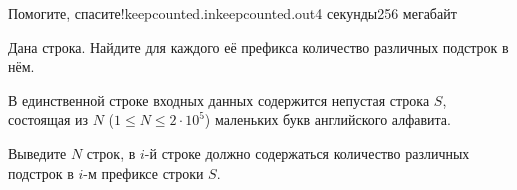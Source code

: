 \begin{problem}{Помогите, спасите!}{keepcounted.in}{keepcounted.out}{4 секунды}{256 мегабайт}

Дана строка. Найдите для каждого её префикса количество различных подстрок в нём.

\InputFile
В единственной строке входных данных содержится непустая строка $S$, состоящая из $N$ ($1 \leq N \leq 2 \cdot 10^5$) маленьких букв английского алфавита.

\OutputFile
Выведите $N$ строк, в $i$-й строке должно содержаться количество различных подстрок в $i$-м префиксе строки $S$.


\Examples

\begin{example}
%
%
\end{example}

\end{problem}
